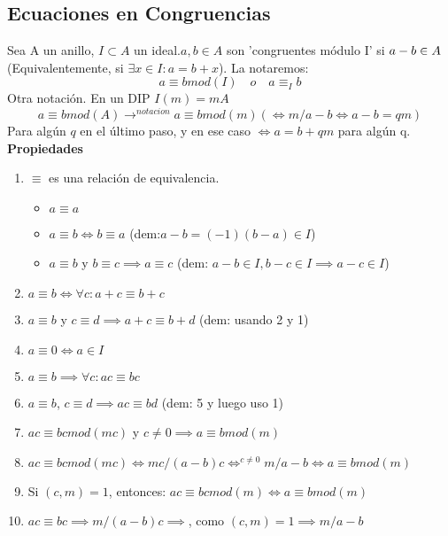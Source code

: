 \documentclass[11pt, a4paper, titlepage]{article}
\makeatletter
\renewenvironment{proof}[1][\proofname] {\vspace{-15pt}\par\pushQED{\qed}\normalfont\topsep6\p@\@plus6\p@\relax\trivlist\item[\hskip\labelsep\it#1\@addpunct{.}]\ignorespaces}{\popQED\endtrivlist\@endpefalse}
\theoremstyle{theorem-style}
\theoremstyle{definition-style}
\theoremstyle{remark-style}
\theoremstyle{example-style}
\newenvironment{nlist}
{\begin{enumerate}
\renewcommand\labelenumi{(\emph{\roman{enumi})}}}
{\end{enumerate}}
\makeatother
\begin{document}
\subsection{Ecuaciones en Congruencias}
Sea A un anillo, $I \subset A$ un ideal.$a,b \in A$ son 'congruentes módulo I' si $a-b \in A\\$(Equivalentemente, si $\exists x \in I : a = b+x$). La notaremos:
\[
a \equiv b mod(I) \quad o \quad a \equiv_ I b
\]
Otra notación. En un DIP $I(m) = mA$
\[
a \equiv bmod(A) \to^{notacion} a \equiv b mod(m) ( \iff m/a-b \iff a-b = qm)
\]
Para algún $q$ en el último paso, y en ese caso $\iff a = b+qm$ para algún q.\\

\textbf{Propiedades}

\begin{nlist}
	\item $\equiv$ es una relación de equivalencia.\begin{itemize}
	\item $a \equiv a$
	\item $a \equiv b \iff b \equiv a$ (dem:$ a-b = (-1)(b-a) \in I$)
	\item $a \equiv b$ y $b \equiv c \implies a \equiv c$ (dem: $a-b\in I, b-c \in I \implies a-c \in I$)
\end{itemize}
	
	\item $a\equiv b \iff \forall c : a+ c \equiv b + c$
	\item $a\equiv b$ y $c \equiv d \implies a+c \equiv b + d$ (dem: usando 2 y 1)
	\item $a \equiv 0 \iff a \in I$
	\item $a \equiv b \implies \forall c : ac  \equiv bc$
	\item $a \equiv b$, $c \equiv d \implies ac \equiv bd$ (dem: 5 y luego uso 1)
	\item $ac \equiv bc mod(mc) $ y $c \ne 0 \implies a\equiv b mod(m)$\\

\begin{proof}
	$ac \equiv bc mod(mc) \iff mc/(a-b)c \iff^{c\ne 0} m/a-b \iff a\equiv b mod(m)$
\end{proof}
	\newpage
	\item Si $(c,m) = 1$, entonces: $ac\equiv bcmod(m) \iff a \equiv bmod(m)$\\
	\begin{proof}
	$ac\equiv bc \implies m/(a-b)c \implies$, como $(c,m) = 1 \implies m/a-b$
\end{proof}
	
	
\end{nlist}
\end{document}
